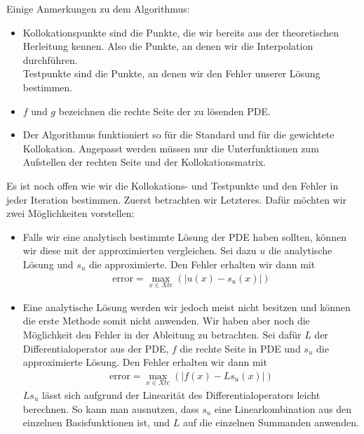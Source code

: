Einige Anmerkungen zu dem Algorithmus:
\begin{itemize}
\item
Kollokationspunkte sind die Punkte, die wir bereits aus der theoretischen Herleitung kennen. Also die Punkte, an denen wir die Interpolation durchführen.\\
Testpunkte sind die Punkte, an denen wir den Fehler unserer Lösung bestimmen.
\item
$f$ und $g$ bezeichnen die rechte Seite der zu lösenden \gls{PDE}.
\item
Der Algorithmus funktioniert so für die Standard und für die gewichtete Kollokation. Angepasst werden müssen nur die Unterfunktionen zum Aufstellen der rechten Seite und der Kollokationsmatrix.
\end{itemize}
Es ist noch offen wie wir die Kollokations- und Testpunkte und den Fehler in jeder Iteration bestimmen. Zuerst betrachten wir Letzteres. Dafür möchten wir zwei Möglichkeiten vorstellen:
\begin{itemize}
\item
Falls wir eine analytisch bestimmte Lösung der \gls{PDE} haben sollten, können wir diese mit der approximierten vergleichen. Sei dazu $u$ die analytische Lösung und $s_u$ die approximierte. Den Fehler erhalten wir dann mit
\begin{align*}
\mathrm{error} = \max_{x \in Xte} \left(\left| u(x) - s_u(x) \right| \right)
\end{align*}
\item
Eine analytische Lösung werden wir jedoch meist nicht besitzen und können die erste Methode somit nicht anwenden. Wir haben aber noch die Möglichkeit den Fehler in der Ableitung zu betrachten. Sei dafür $L$ der Differentialoperator aus der \gls{PDE}, $f$ die rechte Seite in \gls{PDE} und $s_u$ die approximierte Lösung. Den Fehler erhalten wir dann mit
\begin{align*}
\mathrm{error} = \max_{x \in Xte} \left(\left| f(x) - L s_u(x) \right| \right)
\end{align*}
$Ls_u$ lässt sich aufgrund der Linearität des Differentialoperators leicht berechnen. So kann man ausnutzen, dass $s_u$ eine Linearkombination aus den einzelnen Basisfunktionen ist, und $L$ auf die einzelnen Summanden anwenden.
\end{itemize}

